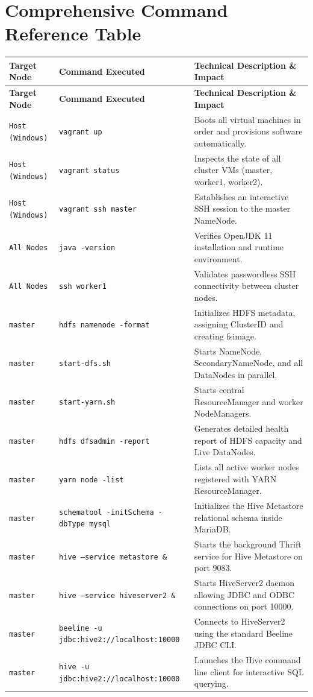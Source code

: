 \documentclass[11pt,a4paper]{article}
\begin{document}
\section{Comprehensive Command Reference Table}
\begin{longtable}{@{}p{3.5cm}p{4cm}p{7.5cm}@{}}
\toprule
\textbf{Target Node} & \textbf{Command Executed} & \textbf{Technical Description \& Impact} \\ \midrule
\endfirsthead
\toprule
\textbf{Target Node} & \textbf{Command Executed} & \textbf{Technical Description \& Impact} \\ \midrule
\endhead
\texttt{Host (Windows)} & \texttt{vagrant up} & Boots all virtual machines in order and provisions software automatically. \\
\texttt{Host (Windows)} & \texttt{vagrant status} & Inspects the state of all cluster VMs (master, worker1, worker2). \\
\texttt{Host (Windows)} & \texttt{vagrant ssh master} & Establishes an interactive SSH session to the master NameNode. \\
\texttt{All Nodes} & \texttt{java -version} & Verifies OpenJDK 11 installation and runtime environment. \\
\texttt{All Nodes} & \texttt{ssh worker1} & Validates passwordless SSH connectivity between cluster nodes. \\
\texttt{master} & \texttt{hdfs namenode -format} & Initializes HDFS metadata, assigning ClusterID and creating fsimage. \\
\texttt{master} & \texttt{start-dfs.sh} & Starts NameNode, SecondaryNameNode, and all DataNodes in parallel. \\
\texttt{master} & \texttt{start-yarn.sh} & Starts central ResourceManager and worker NodeManagers. \\
\texttt{master} & \texttt{hdfs dfsadmin -report} & Generates detailed health report of HDFS capacity and Live DataNodes. \\
\texttt{master} & \texttt{yarn node -list} & Lists all active worker nodes registered with YARN ResourceManager. \\
\texttt{master} & \texttt{schematool -initSchema -dbType mysql} & Initializes the Hive Metastore relational schema inside MariaDB. \\
\texttt{master} & \texttt{hive --service metastore \&} & Starts the background Thrift service for Hive Metastore on port 9083. \\
\texttt{master} & \texttt{hive --service hiveserver2 \&} & Starts HiveServer2 daemon allowing JDBC and ODBC connections on port 10000. \\
\texttt{master} & \texttt{beeline -u jdbc:hive2://localhost:10000} & Connects to HiveServer2 using the standard Beeline JDBC CLI. \\
\texttt{master} & \texttt{hive -u jdbc:hive2://localhost:10000} & Launches the Hive command line client for interactive SQL querying. \\
\bottomrule
\end{longtable}
\end{document}
